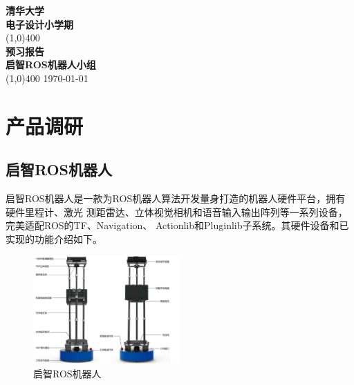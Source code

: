 \documentclass[11pt]{article}
\begin{document}
	
\begin{titlepage}
\begin{center}
\vspace*{1cm}
\Large{\textbf{清华大学}}\\
\Large{\textbf{电子设计小学期}}\\
\vfill
\line(1,0){400}\\[1mm]
\huge{\textbf{预习报告}}\\[3mm]
\Large{\textbf{启智ROS机器人小组}}\\[1mm]
\line(1,0){400}
\vfill
\today \\
\end{center}
\end{titlepage}

\tableofcontents
\thispagestyle{empty}
\clearpage

\setcounter{page}{1}
\noindent
\section{产品调研}
\subsection{启智ROS机器人}
启智ROS机器人是一款为ROS机器人算法开发量身打造的机器人硬件平台，拥有硬件里程计、激光 测距雷达、立体视觉相机和语音输入输出阵列等一系列设备，完美适配ROS的TF、Navigation、 Actionlib和Pluginlib子系统。其硬件设备和已实现的功能介绍如下。
\begin{figure}[H] %
    \centering %
    \includegraphics[width=0.5\textwidth]{5} %
    \caption{启智ROS机器人}
\end{figure}
\end{document}
